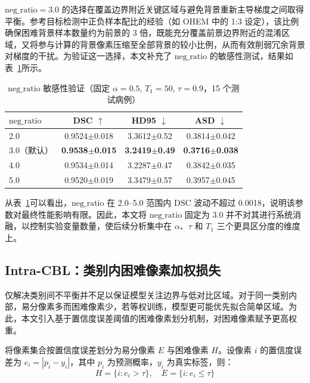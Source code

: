 $\text{neg\_ratio}=3.0$ 的选择在覆盖边界附近关键区域与避免背景重新主导梯度之间取得平衡。参考目标检测中正负样本配比的经验（如 OHEM\cite{shrivastava2016ohem} 中的 1:3 设定），该比例确保困难背景样本数量约为前景的 3 倍，既能充分覆盖前景边界附近的混淆区域，又将参与计算的背景像素压缩至全部背景的较小比例，从而有效削弱冗余背景对梯度的干扰。为验证这一选择，本文补充了 $\text{neg\_ratio}$ 的敏感性测试，结果如表~\ref{tab:neg_ratio_ablation}所示。

\begin{table}[htbp]
  \centering
  \caption{$\text{neg\_ratio}$ 敏感性验证（固定 $\alpha{=}0.5$, $T_1{=}50$, $\tau{=}0.9$，15 个测试病例）}
  \label{tab:neg_ratio_ablation}
  \scriptsize
  \begin{tabular}{lccc}
    \hline
    $\text{neg\_ratio}$ & DSC $\uparrow$ & HD95 $\downarrow$ & ASD $\downarrow$ \\
    \hline
    2.0 & 0.9524$\pm$0.018 & 3.3612$\pm$0.52 & 0.3814$\pm$0.042 \\
    3.0（默认） & \textbf{0.9538$\pm$0.015} & \textbf{3.2419$\pm$0.49} & \textbf{0.3716$\pm$0.038} \\
    4.0 & 0.9534$\pm$0.014 & 3.2287$\pm$0.47 & 0.3842$\pm$0.035 \\
    5.0 & 0.9520$\pm$0.019 & 3.3479$\pm$0.57 & 0.3957$\pm$0.045 \\
    \hline
  \end{tabular}
\end{table}

从表~\ref{tab:neg_ratio_ablation}可以看出，$\text{neg\_ratio}$ 在 2.0--5.0 范围内 DSC 波动不超过 0.0018，说明该参数对最终性能影响有限。因此，本文将 $\text{neg\_ratio}$ 固定为 3.0 并不对其进行系统消融，以控制实验变量数量，使后续分析集中在 $\alpha$、$\tau$ 和 $T_1$ 三个更具区分度的维度上。

\subsection{Intra-CBL：类别内困难像素加权损失}

仅解决类别间不平衡并不足以保证模型关注边界与低对比区域。对于同一类别内部，易分像素多而困难像素少，若等权训练，模型更可能优先拟合简单区域。为此，本文引入基于置信度误差阈值的困难像素划分机制，对困难像素赋予更高权重。

将像素集合按置信度误差划分为易分像素 $E$ 与困难像素 $H$。设像素 $i$ 的置信度误差为 $e_i = |p_i-y_i|$，其中 $p_i$ 为预测概率，$y_i$ 为真实标签，则：
\begin{equation}
H = \{i : e_i > \tau\}, \quad E = \{i : e_i \leq \tau\}
\end{equation}

